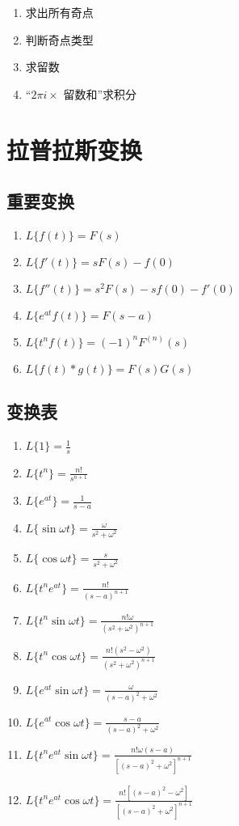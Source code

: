 \documentclass{article}
\begin{document}
\begin{enumerate}
    \item 求出所有奇点
    \item 判断奇点类型
    \item 求留数
    \item “$ 2 \pi i \times$ 留数和”求积分
\end{enumerate}

\section{拉普拉斯变换}

\subsection{重要变换}

\begin{enumerate}
    \item $L\{f(t)\} = F(s)$
    \item $L\{f'(t)\} = sF(s) - f(0)$
    \item $L\{f''(t)\} = s^2 F(s) - sf(0) - f'(0)$
    \item $L\{e^{at} f(t)\} = F(s-a)$
    \item $L\{t^n f(t)\} = (-1)^n F^{(n)}(s)$
    \item $L\{f(t) * g(t)\} = F(s)G(s)$
\end{enumerate}

\subsection{变换表}

\begin{enumerate}
    \item $L\{1\} = \frac{1}{s}$
    \item $L\{t^n\} = \frac{n!}{s^{n+1}}$
    \item $L\{e^{at}\} = \frac{1}{s-a}$
    \item $L\{\sin \omega t\} = \frac{\omega}{s^2 + \omega^2}$
    \item $L\{\cos \omega t\} = \frac{s}{s^2 + \omega^2}$
    \item $L\{t^n e^{at}\} = \frac{n!}{(s-a)^{n+1}}$
    \item $L\{t^n \sin \omega t\} = \frac{n! \omega}{(s^2 + \omega^2)^{n+1}}$
    \item $L\{t^n \cos \omega t\} = \frac{n! (s^2 - \omega^2)}{(s^2 + \omega^2)^{n+1}}$
    \item $L\{e^{at} \sin \omega t\} = \frac{\omega}{(s-a)^2 + \omega^2}$
    \item $L\{e^{at} \cos \omega t\} = \frac{s-a}{(s-a)^2 + \omega^2}$
    \item $L\{t^n e^{at} \sin \omega t\} = \frac{n! \omega (s-a)}{[(s-a)^2 + \omega^2]^{n+1}}$
    \item $L\{t^n e^{at} \cos \omega t\} = \frac{n! [(s-a)^2 - \omega^2]}{[(s-a)^2 + \omega^2]^{n+1}}$
\end{enumerate}
\end{document}
